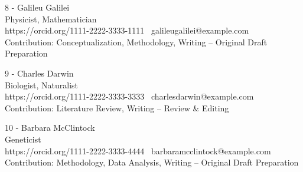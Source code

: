 8 - Galileu Galilei\\
Physicist, Mathematician\\
https://orcid.org/1111-2222-3333-1111 \custombullet~galileugalilei@example.com\\
Contribution: Conceptualization, Methodology, Writing – Original Draft Preparation

9 - Charles Darwin\\
Biologist, Naturalist\\
https://orcid.org/1111-2222-3333-3333 \custombullet~charlesdarwin@example.com\\
Contribution: Literature Review, Writing – Review \& Editing

10 - Barbara McClintock\\
Geneticist\\
https://orcid.org/1111-2222-3333-4444 \custombullet~barbaramcclintock@example.com\\
Contribution: Methodology, Data Analysis, Writing – Original Draft Preparation
